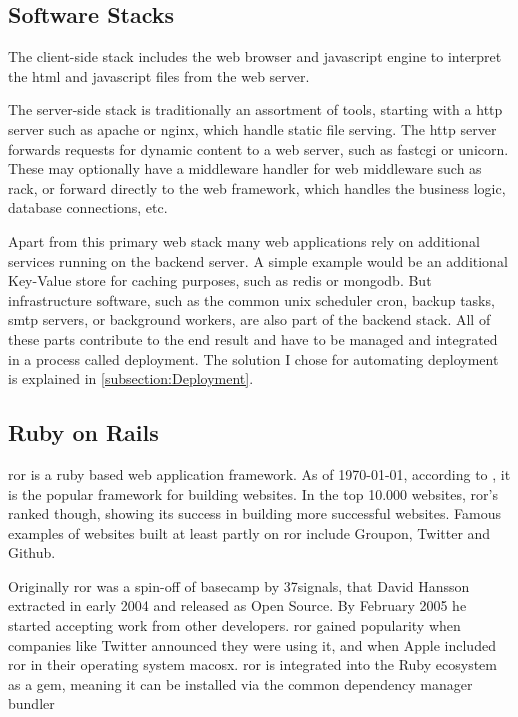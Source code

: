 \subsection{Software Stacks}

The client-side stack includes the web browser and \gls{javascript} engine to interpret the \gls{html} and \gls{javascript} files from the web server.

The server-side stack is traditionally an assortment of tools, starting with a \gls{http} server such as \gls{apache} or \gls{nginx}, which handle static file serving. The \gls{http} server forwards requests for dynamic content to a web server, such as \gls{fastcgi} or \gls{unicorn}. These may optionally have a middleware handler for web middleware such as \gls{rack}, or forward directly to the web framework, which handles the business logic, database connections, etc.

Apart from this primary web stack many web applications rely on additional services running on the backend server. A simple example would be an additional Key-Value store for caching purposes, such as \gls{redis} or \gls{mongodb}. But infrastructure software, such as the common unix scheduler \gls{cron}, backup tasks, \gls{smtp} servers, or background workers, are also part of the backend stack. All of these parts contribute to the end result and have to be managed and integrated in a process called deployment. The solution I chose for automating deployment is explained in \autoref{subsection:Deployment}.

\subsection{Ruby on Rails}

\acrfull{ror} is a \gls{ruby} based web application framework. As of \today, according to \citet{builtwith}, it is the  popular framework for building websites. In the top 10.000 websites, \gls{ror}'s ranked  though, showing its success in building more successful websites. Famous examples of websites built at least partly on \gls{ror} include Groupon, Twitter and Github\citep{ror}.

Originally \gls{ror} was a spin-off of \gls{basecamp} by 37signals, that David Hansson extracted in early 2004 and released as Open Source.\citep{railsinterview} By February 2005 he started accepting work from other developers. \gls{ror} gained popularity when companies like Twitter announced they were using it\citep{forbestwitterror}, and when Apple included \gls{ror} in their operating system \gls{macosx}. \gls{ror} is integrated into the Ruby ecosystem as a \gls{gem}, meaning it can be installed via the common dependency manager \gls{bundler}

